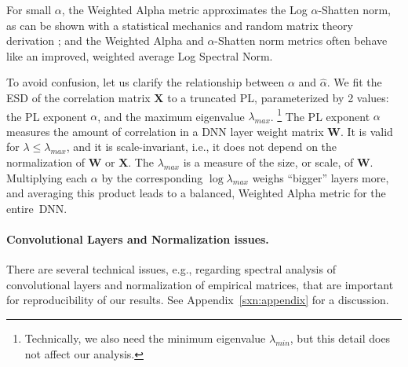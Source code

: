\noindent
For small $\alpha$, the Weighted Alpha metric approximates the Log $\alpha$-Shatten norm, as can be shown with a statistical mechanics and random matrix theory derivation \cite{MM20_unpub_work}; and the Weighted Alpha and $\alpha$-Shatten norm metrics often behave like an improved, weighted average Log Spectral Norm.

To avoid confusion, let us clarify the relationship between $\alpha$ and $\hat{\alpha}$.  
We fit the ESD of the correlation matrix $\mathbf{X}$ to a truncated PL, parameterized by 2 values: the PL exponent $\alpha$, and the maximum eigenvalue $\lambda_{max}$.%
\footnote{Technically, we also need the minimum eigenvalue $\lambda_{min}$, but this detail does not affect our analysis.}
The PL exponent $\alpha$ measures the amount of correlation in a DNN layer weight matrix $\mathbf{W}$. 
It is valid for $\lambda\le\lambda_{max}$, and it is scale-invariant, i.e., it does not depend on the normalization of $\mathbf{W}$ or $\mathbf{X}$.
The $\lambda_{max}$ is a measure of the size, or scale, of $\mathbf{W}$.
%
Multiplying each $\alpha$ by the corresponding $\log\lambda_{max}$ weighs ``bigger'' layers more, and averaging this product leads to a balanced, Weighted Alpha metric for the entire~DNN.


\paragraph{Convolutional Layers and Normalization issues.}
There are several technical issues, e.g., regarding spectral analysis of convolutional layers and normalization of empirical matrices, that are important for reproducibility of our results.
See Appendix~\ref{sxn:appendix} for a discussion.


